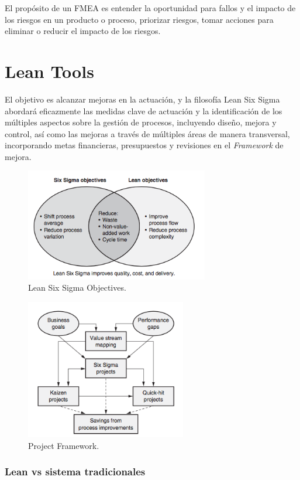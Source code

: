 \documentclass[]{article}
\begin{document}
El propósito de un FMEA es entender la oportunidad para fallos y el impacto de los riesgos en un producto o proceso, priorizar riesgos, tomar acciones para eliminar o reducir el impacto de los riesgos.

\section{Lean Tools}
El objetivo es alcanzar mejoras en la actuación, y la filosofía Lean Six Sigma abordará eficazmente las medidas clave de actuación y la identificación de los múltiples aspectos sobre la gestión de procesos, incluyendo diseño, mejora y control, así como las mejoras a través de múltiples áreas de manera transversal, incorporando metas financieras, presupuestos y revisiones en el \textit{Framework} de mejora.

\begin{figure}[H]
	\centering
	\includegraphics[width=80mm]{imagenes/LeanSixSigmaObjectives.png}
	\caption{Lean Six Sigma Objectives.}
	\label{fig:LeanSixSigmaObjectives}
\end{figure}

\begin{figure}[H]
	\centering
	\includegraphics[width=70mm]{imagenes/ProjectFramework.png}
	\caption{Project Framework.}
	\label{fig:ProjectFramework}
\end{figure}

\subsubsection{Lean vs sistema tradicionales}
\end{document}
